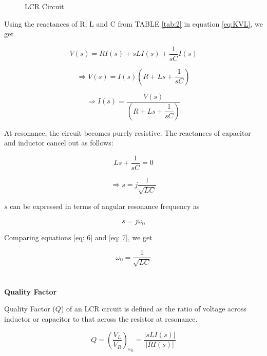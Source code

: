 \documentclass[journal,12pt,twocolumn]{IEEEtran}
\theoremstyle{remark}
\begin{document}
\begin{figure}[h]
 \centering
    
    \caption{LCR Circuit}
    \label{fig:2}
\end{figure}

Using the reactances of R, L and C from TABLE \ref{tab:2} in equation \eqref{eq:KVL}, we get

\begin{equation}
    V(s) = R I(s) + sL I(s) + \dfrac{1}{sC} I(s)
\end{equation}

\begin{equation}
    \Rightarrow V(s) = I(s)\left(R + Ls + \dfrac{1}{sC}\right)
\end{equation}

\begin{equation}
    \Rightarrow I(s) = \dfrac{V(s)}{\left(R + Ls + \dfrac{1}{sC}\right)} \label{eq: 4}
\end{equation}

At resonance, the circuit becomes purely resistive. The reactances of capacitor and inductor cancel out as follows:

\begin{equation}
    Ls + \dfrac{1}{sC} = 0
\end{equation}

\begin{equation}
    \Rightarrow s = j\dfrac{1}{\sqrt{LC}} \label{eq: 6}
\end{equation}

$s$ can be expressed in terms of angular resonance frequency as

\begin{equation}
    s = j\omega_0 \label{eq: 7}
\end{equation}

Comparing equations \eqref{eq: 6} and \eqref{eq: 7}, we get

\begin{equation}
    \omega_0 = \dfrac{1}{\sqrt{LC}}
\end{equation}\\
\\
\textbf{Quality Factor}

Quality Factor ($Q$) of an LCR circuit is defined as the ratio of voltage across inductor or capacitor to that across the resistor at resonance.

\begin{equation}
    Q = \left(\dfrac{V_L}{V_R}\right)_{\omega_0} = \dfrac{\lvert{sLI(s)}\rvert}{\lvert RI(s) \rvert}
\end{equation}
\end{document}
